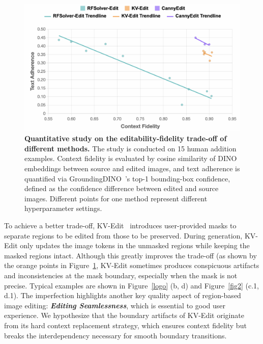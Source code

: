 \documentclass{article}
\begin{document}
\begin{figure}
  \vspace{-12pt} %
    \includegraphics[width=1\linewidth]{figures/tl2.png}
\caption{\small \textbf{Quantitative study on the editability-fidelity trade-off of different methods.}
The study is conducted on 15 human addition examples. Context fidelity is evaluated by cosine similarity of DINO \citep{caron2021emerging} embeddings between source and edited images, and text adherence is quantified via GroundingDINO~\citep{liu2024grounding}'s top-1 bounding-box confidence, defined as the confidence difference between edited and source images.  Different points for one method represent different hyperparameter settings.}
    \label{treadline}
      \vspace{-5pt} %
\end{figure}

To achieve a better trade-off, KV-Edit~\citep{zhu2025kv} introduces user-provided masks to separate regions to be edited from those to be preserved.
During generation, KV-Edit only updates the image tokens in the unmasked regions while keeping the masked regions intact.
Although this greatly improves the trade-off (as shown by the orange points in Figure~\ref{treadline}, KV-Edit sometimes produces conspicuous artifacts and inconsistencies at the mask boundary, especially when the mask is not precise.
Typical examples are shown in Figure~\ref{logo} (b, d) and Figure~\ref{fig2} (c.1, d.1).
The imperfection highlights another key quality aspect of region-based image editing: \textbf{\textit{Editing Seamlessness}}, which is essential to good user experience.
{We hypothesize that the boundary artifacts of KV-Edit originate from its hard context replacement strategy, which ensures context fidelity but breaks the interdependency necessary for smooth boundary transitions.}
\end{document}
